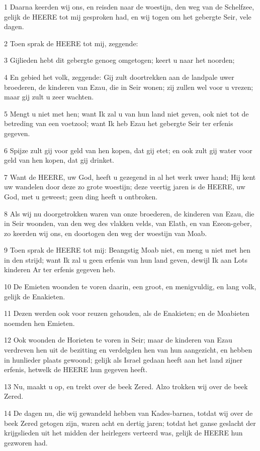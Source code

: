 \par 1 Daarna keerden wij ons, en reisden naar de woestijn, den weg van de Schelfzee, gelijk de HEERE tot mij gesproken had, en wij togen om het gebergte Seir, vele dagen.
\par 2 Toen sprak de HEERE tot mij, zeggende:
\par 3 Gijlieden hebt dit gebergte genoeg omgetogen; keert u naar het noorden;
\par 4 En gebied het volk, zeggende: Gij zult doortrekken aan de landpale uwer broederen, de kinderen van Ezau, die in Seir wonen; zij zullen wel voor u vrezen; maar gij zult u zeer wachten.
\par 5 Mengt u niet met hen; want Ik zal u van hun land niet geven, ook niet tot de betreding van een voetzool; want Ik heb Ezau het gebergte Seir ter erfenis gegeven.
\par 6 Spijze zult gij voor geld van hen kopen, dat gij etet; en ook zult gij water voor geld van hen kopen, dat gij drinket.
\par 7 Want de HEERE, uw God, heeft u gezegend in al het werk uwer hand; Hij kent uw wandelen door deze zo grote woestijn; deze veertig jaren is de HEERE, uw God, met u geweest; geen ding heeft u ontbroken.
\par 8 Als wij nu doorgetrokken waren van onze broederen, de kinderen van Ezau, die in Seir woonden, van den weg des vlakken velds, van Elath, en van Ezeon-geber, zo keerden wij ons, en doortogen den weg der woestijn van Moab.
\par 9 Toen sprak de HEERE tot mij: Beangstig Moab niet, en meng u niet met hen in den strijd; want Ik zal u geen erfenis van hun land geven, dewijl Ik aan Lots kinderen Ar ter erfenis gegeven heb.
\par 10 De Emieten woonden te voren daarin, een groot, en menigvuldig, en lang volk, gelijk de Enakieten.
\par 11 Dezen werden ook voor reuzen gehouden, als de Enakieten; en de Moabieten noemden hen Emieten.
\par 12 Ook woonden de Horieten te voren in Seir; maar de kinderen van Ezau verdreven hen uit de bezitting en verdelgden hen van hun aangezicht, en hebben in hunlieder plaats gewoond; gelijk als Israel gedaan heeft aan het land zijner erfenis, hetwelk de HEERE hun gegeven heeft.
\par 13 Nu, maakt u op, en trekt over de beek Zered. Alzo trokken wij over de beek Zered.
\par 14 De dagen nu, die wij gewandeld hebben van Kades-barnea, totdat wij over de beek Zered getogen zijn, waren acht en dertig jaren; totdat het ganse geslacht der krijgslieden uit het midden der heirlegers verteerd was, gelijk de HEERE hun gezworen had.
